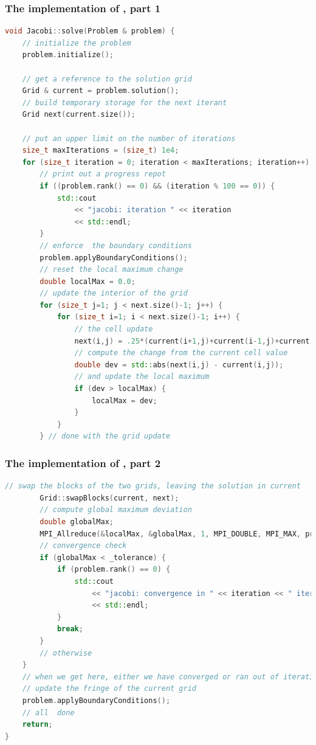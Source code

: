 \begin{frame}[fragile]
%
  \frametitle{The implementation of , part 1}
%
  \begin{lstlisting}[language=c++,name=mpi:solver,fistnumber=14,basicstyle=\tt\bfseries\tiny]
void Jacobi::solve(Problem & problem) {
    // initialize the problem
    problem.initialize();

    // get a reference to the solution grid
    Grid & current = problem.solution();
    // build temporary storage for the next iterant
    Grid next(current.size());

    // put an upper limit on the number of iterations
    size_t maxIterations = (size_t) 1e4;
    for (size_t iteration = 0; iteration < maxIterations; iteration++) {
        // print out a progress repot
        if ((problem.rank() == 0) && (iteration % 100 == 0)) {
            std::cout 
                << "jacobi: iteration " << iteration
                << std::endl;
        }
        // enforce  the boundary conditions
        problem.applyBoundaryConditions();
        // reset the local maximum change
        double localMax = 0.0;
        // update the interior of the grid
        for (size_t j=1; j < next.size()-1; j++) {
            for (size_t i=1; i < next.size()-1; i++) {
                // the cell update
                next(i,j) = .25*(current(i+1,j)+current(i-1,j)+current(i,j+1)+current(i,j-1));
                // compute the change from the current cell value
                double dev = std::abs(next(i,j) - current(i,j));
                // and update the local maximum
                if (dev > localMax) {
                    localMax = dev;
                }
            }
        } // done with the grid update
  \end{lstlisting}
% 
\end{frame}

\begin{frame}[fragile]
%
  \frametitle{The implementation of , part 2}
%
  \begin{lstlisting}[language=c++,name=mpi:solver,basicstyle=\tt\bfseries\tiny]
        // swap the blocks of the two grids, leaving the solution in current
        Grid::swapBlocks(current, next);
        // compute global maximum deviation
        double globalMax;
        MPI_Allreduce(&localMax, &globalMax, 1, MPI_DOUBLE, MPI_MAX, problem.communicator());
        // convergence check
        if (globalMax < _tolerance) {
            if (problem.rank() == 0) {
                std::cout 
                    << "jacobi: convergence in " << iteration << " iterations"
                    << std::endl;
            }
            break;
        }
        // otherwise
    }
    // when we get here, either we have converged or ran out of iterations
    // update the fringe of the current grid
    problem.applyBoundaryConditions();
    // all  done
    return;
}
  \end{lstlisting}
% 
\end{frame}

